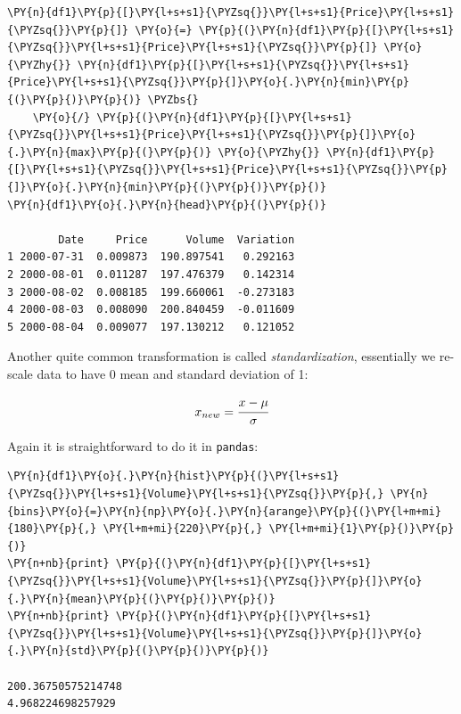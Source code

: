 \begin{tcolorbox}[breakable, size=fbox, boxrule=1pt, pad at break*=1mm,colback=cellbackground, colframe=cellborder]
\begin{Verbatim}[commandchars=\\\{\}]
\PY{n}{df1}\PY{p}{[}\PY{l+s+s1}{\PYZsq{}}\PY{l+s+s1}{Price}\PY{l+s+s1}{\PYZsq{}}\PY{p}{]} \PY{o}{=} \PY{p}{(}\PY{n}{df1}\PY{p}{[}\PY{l+s+s1}{\PYZsq{}}\PY{l+s+s1}{Price}\PY{l+s+s1}{\PYZsq{}}\PY{p}{]} \PY{o}{\PYZhy{}} \PY{n}{df1}\PY{p}{[}\PY{l+s+s1}{\PYZsq{}}\PY{l+s+s1}{Price}\PY{l+s+s1}{\PYZsq{}}\PY{p}{]}\PY{o}{.}\PY{n}{min}\PY{p}{(}\PY{p}{)}\PY{p}{)} \PYZbs{}
    \PY{o}{/} \PY{p}{(}\PY{n}{df1}\PY{p}{[}\PY{l+s+s1}{\PYZsq{}}\PY{l+s+s1}{Price}\PY{l+s+s1}{\PYZsq{}}\PY{p}{]}\PY{o}{.}\PY{n}{max}\PY{p}{(}\PY{p}{)} \PY{o}{\PYZhy{}} \PY{n}{df1}\PY{p}{[}\PY{l+s+s1}{\PYZsq{}}\PY{l+s+s1}{Price}\PY{l+s+s1}{\PYZsq{}}\PY{p}{]}\PY{o}{.}\PY{n}{min}\PY{p}{(}\PY{p}{)}\PY{p}{)}
\PY{n}{df1}\PY{o}{.}\PY{n}{head}\PY{p}{(}\PY{p}{)}

        Date     Price      Volume  Variation
1 2000-07-31  0.009873  190.897541   0.292163
2 2000-08-01  0.011287  197.476379   0.142314
3 2000-08-02  0.008185  199.660061  -0.273183
4 2000-08-03  0.008090  200.840459  -0.011609
5 2000-08-04  0.009077  197.130212   0.121052
\end{Verbatim}
\end{tcolorbox}
        
Another quite common transformation is called \emph{standardization}, essentially we re-scale data to 
have 0 mean and standard deviation of 1:

\begin{equation}
x_{new} = \cfrac{x-\mu}{\sigma}
\label{eq:standardization}
\end{equation}

Again it is straightforward to do it in \texttt{pandas}:

\begin{tcolorbox}[breakable, size=fbox, boxrule=1pt, pad at break*=1mm,colback=cellbackground, colframe=cellborder]
\begin{Verbatim}[commandchars=\\\{\}]
\PY{n}{df1}\PY{o}{.}\PY{n}{hist}\PY{p}{(}\PY{l+s+s1}{\PYZsq{}}\PY{l+s+s1}{Volume}\PY{l+s+s1}{\PYZsq{}}\PY{p}{,} \PY{n}{bins}\PY{o}{=}\PY{n}{np}\PY{o}{.}\PY{n}{arange}\PY{p}{(}\PY{l+m+mi}{180}\PY{p}{,} \PY{l+m+mi}{220}\PY{p}{,} \PY{l+m+mi}{1}\PY{p}{)}\PY{p}{)}
\PY{n+nb}{print} \PY{p}{(}\PY{n}{df1}\PY{p}{[}\PY{l+s+s1}{\PYZsq{}}\PY{l+s+s1}{Volume}\PY{l+s+s1}{\PYZsq{}}\PY{p}{]}\PY{o}{.}\PY{n}{mean}\PY{p}{(}\PY{p}{)}\PY{p}{)}
\PY{n+nb}{print} \PY{p}{(}\PY{n}{df1}\PY{p}{[}\PY{l+s+s1}{\PYZsq{}}\PY{l+s+s1}{Volume}\PY{l+s+s1}{\PYZsq{}}\PY{p}{]}\PY{o}{.}\PY{n}{std}\PY{p}{(}\PY{p}{)}\PY{p}{)}

200.36750575214748
4.968224698257929
\end{Verbatim}
\end{tcolorbox}


